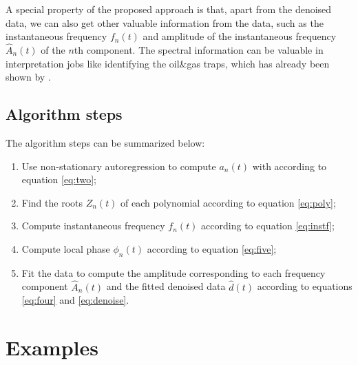 A special property of the proposed approach is that, apart from the denoised data, we can also get other valuable information from the data, such as the instantaneous frequency $f_n(t)$ and amplitude of the instantaneous frequency $\hat{A}_n(t)$ of the $n$th component. The spectral information can be valuable in interpretation jobs like identifying the oil\&gas traps, which has already been shown by \cite{sdrnar}.


\subsection{Algorithm steps}
The algorithm steps can be summarized below:
\begin{enumerate}
\item Use non-stationary autoregression to compute $a_n(t)$ with  according to equation \ref{eq:two};
\item Find the roots $Z_n(t)$ of each polynomial according to equation \ref{eq:poly};
\item Compute instantaneous frequency $f_n(t)$ according to equation \ref{eq:instf};
\item Compute local phase $\phi_n(t)$ according to equation \ref{eq:five};
\item Fit the data to compute the amplitude corresponding to each frequency component $\hat{A}_n(t)$ and the fitted denoised data $\hat{d}(t)$ according to equations \ref{eq:four} and \ref{eq:denoise}.
\end{enumerate}


\section{Examples}





